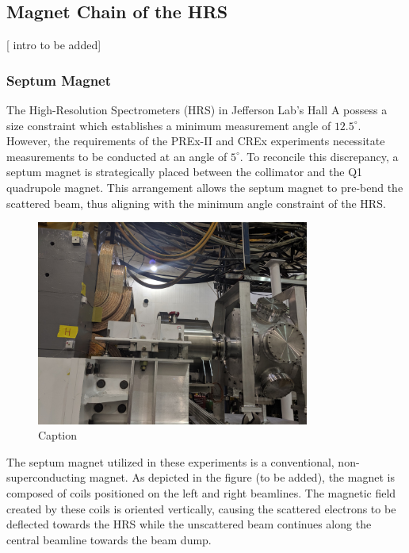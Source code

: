 \subsection{Magnet Chain of the HRS}

[ intro to be added]

\subsubsection{Septum Magnet}

The High-Resolution Spectrometers (HRS) in Jefferson Lab's Hall A possess a size constraint which establishes a minimum measurement angle of $12.5^\circ$. However, the requirements of the PREx-II and CREx experiments necessitate measurements to be conducted at an angle of $5^\circ$. To reconcile this discrepancy, a septum magnet is strategically placed between the collimator and the Q1 quadrupole magnet. This arrangement allows the septum magnet to pre-bend the scattered beam, thus aligning with the minimum angle constraint of the HRS.

\begin{figure}
    \centering
    \includegraphics[width=0.8\textwidth]{images/chap3/septum_colli_targ_photo.jpg}
    \caption{Caption}
    \label{fig:enter-label}
\end{figure}

The septum magnet utilized in these experiments is a conventional, non-superconducting magnet. As depicted in the figure (to be added), the magnet is composed of coils positioned on the left and right beamlines. The magnetic field created by these coils is oriented vertically, causing the scattered electrons to be deflected towards the HRS while the unscattered beam continues along the central beamline towards the beam dump.

